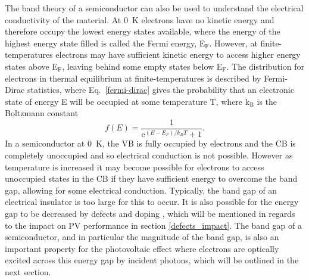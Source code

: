 \documentclass[11pt, twoside]{report}
\begin{document}

The band theory of a semiconductor can also be used to understand the electrical conductivity of the material. At \SI{0}{K} electrons have no kinetic energy and therefore occupy the lowest energy states available, where the energy of the highest energy state filled is called the Fermi energy, E$_\mathrm{F}$. However, at finite-temperatures electrons may have sufficient kinetic energy to access higher energy states above E$_\mathrm{F}$, leaving behind some empty states below E$_\mathrm{F}$. The distribution for electrons in thermal equilibrium at finite-temperatures is described by Fermi-Dirac statistics, where Eq.~\ref{fermi-dirac} gives the probability that an electronic state of energy E will be occupied at some temperature T, where k$_\mathrm{B}$ is the Boltzmann constant \cite{Nelson3}
\begin{equation}\label{fermi-dirac}
f(E) = \frac{1}{\mathrm{e}^{(E-E_F)/k_BT}+1} .
\end{equation}
In a semiconductor at \SI{0}{K}, the VB is fully occupied by electrons and the CB is completely unoccupied and so electrical conduction is not possible. However as temperature is increased it may become possible for electrons to access unoccupied states in the CB if they have sufficient energy to overcome the band gap, allowing for some electrical conduction. Typically, the band gap of an electrical insulator is too large for this to occur. It is also possible for the energy gap to be decreased by defects and doping \cite{Nelson3}, which will be mentioned in regards to the impact on PV performance in section \ref{defects_impact}. The band gap of a semiconductor, and in particular the magnitude of the band gap, is also an important property for the photovoltaic effect where electrons are optically excited across this energy gap by incident photons, which will be outlined in the next section.

\end{document}
